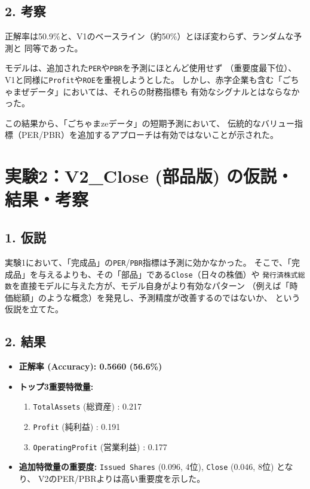 \documentclass[a4paper, 11pt]{ltjsarticle}
\begin{document}
\subsection*{2. 考察}
正解率は50.9\%と、V1のベースライン（約50\%）とほぼ変わらず、ランダムな予測と
同等であった。

モデルは、追加された\texttt{PER}や\texttt{PBR}を予測にほとんど使用せず
（重要度最下位）、V1と同様に\texttt{Profit}や\texttt{ROE}を重視しようとした。
しかし、赤字企業も含む「ごちゃまぜデータ」においては、それらの財務指標も
有効なシグナルとはならなかった。

この結果から、「ごちゃまzeデータ」の短期予測において、
伝統的なバリュー指標（PER/PBR）を追加するアプローチは有効ではないことが示された。

\section{実験2：V2\_Close (部品版) の仮説・結果・考察}
\subsection*{1. 仮説}
実験1において、「完成品」の\texttt{PER}/\texttt{PBR}指標は予測に効かなかった。
そこで、「完成品」を与えるよりも、その「部品」である\texttt{Close}（日々の株価）や
\texttt{発行済株式総数}を直接モデルに与えた方が、モデル自身がより有効なパターン
（例えば「時価総額」のような概念）を発見し、予測精度が改善するのではないか、
という仮説を立てた。

\subsection*{2. 結果}
\begin{itemize}
    \item \textbf{正解率 (Accuracy): 0.5660 (56.6\%)}
    \item \textbf{トップ3重要特徴量:}
    \begin{enumerate}
        \item \texttt{TotalAssets} (総資産) : 0.217
        \item \texttt{Profit} (純利益) : 0.191
        \item \texttt{OperatingProfit} (営業利益) : 0.177
    \end{enumerate}
    \item \textbf{追加特徴量の重要度:} \texttt{Issued Shares} (0.096, 4位), \texttt{Close} (0.046, 8位) となり、
    V2のPER/PBRよりは高い重要度を示した。
\end{itemize}
\end{document}
